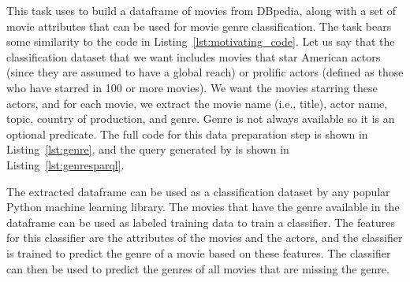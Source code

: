 This task uses \rdfframes to build a dataframe of movies from DBpedia, along with
a set of movie attributes that can be used for 
movie genre classification.
The task bears some similarity to the code in Listing~\ref{lst:motivating_code}.
Let us say that the classification dataset that we want
includes movies that star
American actors (since they are assumed to have a global reach)
or prolific actors (defined as those who have starred in 100 or more movies).
We want the movies starring these actors, and for each movie, we extract the movie name (i.e., title), actor name, topic, country of production, and genre.
Genre is not always available so it is an optional predicate.
The full code for this data preparation step is shown in Listing~\ref{lst:genre}, and the \sparql query generated by \rdfframes is shown in Listing~\ref{lst:genresparql}.



The extracted dataframe can be used as a classification dataset by any popular Python machine learning library.
The movies that have the genre available in the dataframe can be used as labeled training data to train a classifier.
The features for this classifier are the attributes of the movies and the actors, and the classifier is trained to predict the genre of a movie based on these features.
The classifier can then be used to predict the genres of all movies that are missing the genre.


